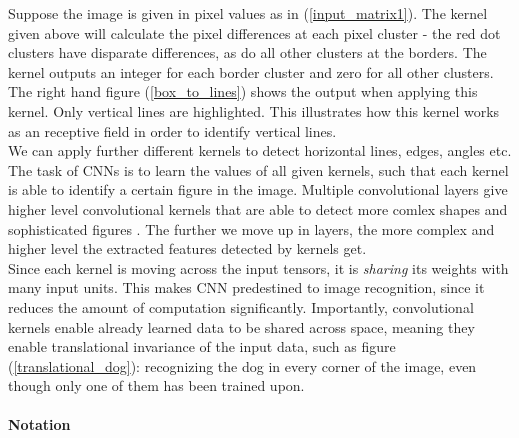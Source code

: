 \documentclass{article}
\begin{document}
Suppose the image is given in pixel values as in (\ref{input_matrix1}). The kernel given above will calculate the pixel differences at each pixel cluster - the red dot clusters have disparate differences, as do all other clusters at the borders. The kernel outputs an integer for each border cluster and zero for all other clusters. The right hand figure (\ref{box_to_lines}) shows the output when applying this kernel. Only vertical lines are highlighted. This illustrates how this kernel works as an receptive field in order to identify vertical lines.\\
We can apply further different kernels to detect horizontal lines, edges, angles etc. The task of CNNs is to learn the values of all given kernels, such that each kernel is able to identify a certain figure in the image. Multiple convolutional layers give higher level convolutional kernels that are able to detect more comlex shapes and sophisticated figures \cite{cs231:optimizers}. The further we move up in layers, the more complex and higher level the extracted features detected by kernels get.\\
Since each kernel is moving across the input tensors, it is \textit{sharing} its weights with many input units. This makes CNN predestined to image recognition, since it reduces the amount of computation significantly. Importantly, convolutional kernels enable already learned data to be shared across space, meaning they enable translational invariance of the input data, such as figure (\ref{translational_dog}): recognizing the dog in every corner of the image, even though only one of them has been trained upon.




\paragraph{Notation}
\end{document}
